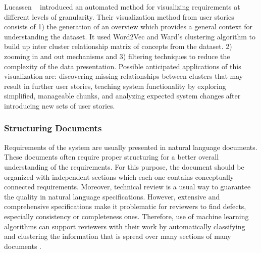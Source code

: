 Lucassen \etal~\cite{Lucassen:2016} introduced an automated method for
visualizing requirements at different levels of granularity. Their visualization method from
user stories consists of 1) the generation of an overview which provides a
general context for understanding the dataset. It used Word2Vec and Ward’s clustering algorithm to build up inter cluster relationship matrix of concepts from the dataset. 
2) zooming in and out mechanisms and 3) filtering techniques to reduce the
complexity of the data presentation. Possible anticipated applications of this
visualization are: discovering missing relationships between clusters that may
result in further user stories, teaching system functionality by exploring
simplified, manageable chunks, and analyzing expected system changes after
introducing new sets of user stories.

\subsubsection{Structuring Documents} 

Requirements of the system are usually presented in natural language documents.
These documents often require proper structuring for a better overall
understanding of the requirements. For this purpose, the document should be
organized with independent sections which each one contains conceptually
connected requirements\cite{Ferrari:2013}. Moreover, technical review is a usual
way to guarantee the quality in natural language specifications. However,
extensive and comprehensive specifications make it problematic for reviewers to
find defects, especially consistency or completeness ones. Therefore, use of
machine learning algorithms can support reviewers with their work by
automatically classifying and clustering the information that is spread over
many sections of many documents \cite{Ott:2013}.

